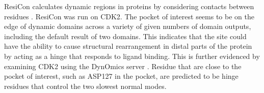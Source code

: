 ResiCon calculates dynamic regions in proteins by considering contacts between residues \cite{Dziubinski2016}.
ResiCon was run on CDK2.
The pocket of interest seems to be on the edge of dynamic domains across a variety of given numbers of domain outputs, including the default result of two domains.
This indicates that the site could have the ability to cause structural rearrangement in distal parts of the protein by acting as a hinge that responds to ligand binding.
This is further evidenced by examining CDK2 using the DynOmics server \cite{Li2017}.
Residue that are close to the pocket of interest, such as ASP127 in the pocket, are predicted to be hinge residues that control the two slowest normal modes.





